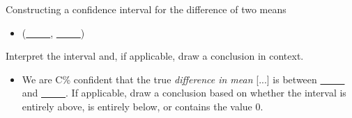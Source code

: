 \begin{onebox}{Constructing a confidence interval for the difference of two means}
\begin{itemize}
\begin{itemize}
\item[] $SE$ of estimate:  $\sqrt{\frac{s^2_1}{n_1}+\frac{s^2_2}{n_2}}$
\item[] $t^{\star}$: use a $t$-table at row $df$ and confidence level C\%
\end{itemize}
\item[] (\underline{\ \ \ \ \ }, \underline{\ \ \ \ \ })
\end{itemize}
  Interpret the interval and, if applicable, draw a conclusion in context.\vspace{-1mm}
\begin{itemize}
\item[] We are C\%  confident that the true \emph{difference in mean} [...] is between \underline{\ \ \ \ \ } and  \underline{\ \ \ \ \ }. If applicable, draw a conclusion based on whether the interval is entirely above, is entirely below, or contains the value 0. 
\end{itemize}\end{onebox}

